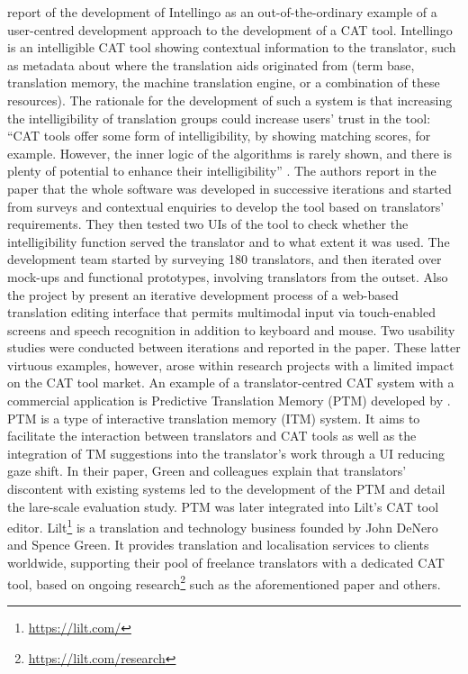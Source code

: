 \cite[381]{laubli2019translation} report of the development of Intellingo \citep{coppers2018intellingo} as an out-of-the-ordinary example of a user-centred development approach to the development of a CAT tool. Intellingo is an intelligible CAT tool showing contextual information to the translator, such as metadata about where the translation aids originated from (term base, translation memory, the machine translation engine, or a combination of these resources). The rationale for the development of such a system is that increasing the intelligibility of translation groups could increase users’ trust in the tool: ``CAT tools offer some form of intelligibility, by showing matching scores, for example. However, the inner logic of the algorithms is rarely shown, and there is plenty of potential to enhance their intelligibility'' \citep[3]{coppers2018intellingo}. The authors report in the paper that the whole software was developed in successive iterations and started from surveys and contextual enquiries to develop the tool based on translators’ requirements. They then tested two UIs of the tool to check whether the intelligibility function served the translator and to what extent it was used. The development team started by surveying 180 translators, and then iterated over mock-ups and functional prototypes, involving translators from the outset. Also the project by \citet{teixeira2019creating} present an iterative development process of a web-based translation editing interface that permits multimodal input via touch-enabled screens and speech recognition in addition to keyboard and mouse. Two usability studies were conducted between iterations and reported in the paper. These latter virtuous examples, however, arose within research projects with a limited impact on the CAT tool market. An example of a translator-centred CAT system with a commercial application is Predictive Translation Memory (PTM) developed by \citet{green2014predictive}. PTM is a type of interactive translation memory (ITM) system. It aims to facilitate the interaction between translators and CAT tools as well as the integration of TM suggestions into the translator’s work through a UI reducing gaze shift. In their paper, Green and colleagues explain that translators’ discontent with existing systems led to the development of the PTM and detail the lare-scale evaluation study. PTM was later integrated into Lilt’s CAT tool editor. Lilt\footnote{\url{https://lilt.com/}} is a translation and technology business founded by John DeNero and Spence Green. It provides translation and localisation services to clients worldwide, supporting their pool of freelance translators with a dedicated CAT tool, based on ongoing research\footnote{\url{https://lilt.com/research}} such as the aforementioned paper and others.





